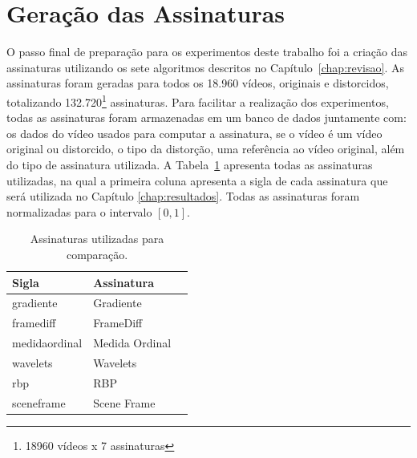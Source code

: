 \section{Geração das Assinaturas}
\label{sec:met-assinaturas}

O passo final de preparação para os experimentos deste trabalho foi a criação das assinaturas utilizando os sete algoritmos descritos no Capítulo~\ref{chap:revisao}. As assinaturas foram geradas para todos os 18.960 vídeos, originais e distorcidos, totalizando 132.720\footnote{18960 vídeos x 7 assinaturas} assinaturas. Para facilitar a realização dos experimentos, todas as assinaturas foram armazenadas em um banco de dados juntamente com: os dados do vídeo usados para computar a assinatura, se o vídeo é um vídeo original ou distorcido, o tipo da distorção, uma referência ao vídeo original, além do tipo de assinatura utilizada. A Tabela~\ref{tab:assinaturas} apresenta todas as assinaturas utilizadas, na qual a primeira coluna apresenta a sigla de cada assinatura que será utilizada no Capítulo \ref{chap:resultados}. Todas as assinaturas foram normalizadas para o intervalo $[0,1]$.


\begin{table}[h]
    \centering
    \caption{Assinaturas utilizadas para comparação.}
    \label{tab:assinaturas}
    \begin{tabular}{|p{}|p{}|p{}|} \hline
        \textbf{Sigla} & \textbf{Assinatura} \\ \hline
        gradiente & Gradiente \\ \hline
        framediff & FrameDiff \\ \hline
        medidaordinal & Medida Ordinal \\ \hline
        wavelets & Wavelets \\ \hline
        rbp & RBP \\ \hline
        sceneframe & Scene Frame \\ \hline
    \end{tabular}
\end{table}


